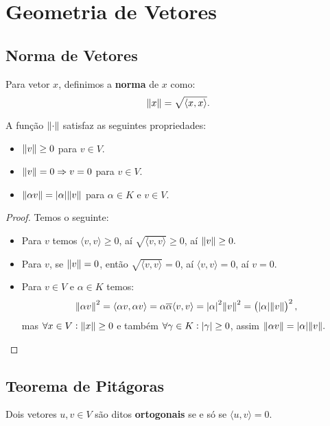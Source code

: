 \documentclass[11pt,twoside,a4paper]{book}
\begin{document}
\newpage

\section{Geometria de Vetores}

\subsection{Norma de Vetores}

\begin{definicao}
Para vetor $x$, definimos a \textbf{norma} de $x$ como:
\[
\norm{x}=\sqrt{\langle x,x\rangle}.
\]
\end{definicao}

\begin{proposicao}\label{norma1}
A função $\norm{\cdot}$ satisfaz as seguintes propriedades:
\begin{itemize}
\item $\norm{v}\geq 0$ para $v\in V$. 
\item $\norm{v}=0\Rightarrow v=0$ para $v\in V$.
\item $\norm{\alpha v}=\abs{\alpha}\norm{v}$ para $\alpha\in K$ e $v\in V$.
\end{itemize}
\end{proposicao}
\begin{proof}
Temos o seguinte:
\begin{itemize}
\item Para $v$ temos $\langle v,v\rangle\geq 0$, aí $\sqrt{\langle v,v\rangle}\geq 0$, aí $\norm{v}\geq 0.$
\item Para $v$, se $\norm{v}=0$, então $\sqrt{\langle v,v\rangle}=0$, aí $\langle v,v\rangle=0$, aí $v=0.$
\item Para $v\in V$ e $\alpha\in K$ temos:
\[
\norm{\alpha v}^2=\langle\alpha v,\alpha v\rangle
=\alpha\overline{\alpha}\langle v,v\rangle
=\abs{\alpha}^2\norm{v}^2
=\left(\abs{\alpha}\norm{v}\right)^2,
\]
mas $\forall x\in V:\norm{x}\geq 0$ e também $\forall\gamma\in K:\abs{\gamma}\geq 0$,
assim $\norm{\alpha v}=\abs{\alpha}\norm{v}.$
\end{itemize}
\end{proof}

\subsection{Teorema de Pitágoras}

\begin{definicao}
Dois vetores $u,v\in V$ são ditos \textbf{ortogonais} se e só se $\langle u,v\rangle=0$.
\end{definicao}
\end{document}
